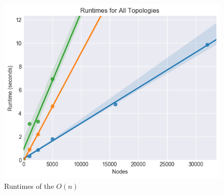 \documentclass{article}
\begin{document}
  \begin{figure}[H]
    \centering
    \includegraphics[width=1 \textwidth]{shared/runtime/running_times}
    \caption{Runtimes of the $O(n)$ }
  \end{figure}

\printbibliography
\end{document}
